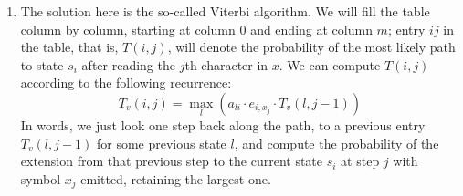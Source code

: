 \documentclass[11pt]{article}
\begin{document}
\begin{enumerate}
  \item
  The solution here is the so-called Viterbi algorithm.  We will fill the table
  column by column, starting at column 0 and ending at column $m$; entry
  $ij$ in the table, that is, $T(i,j)$, will denote the probability of
  the most likely path to state $s_i$ after reading the $j$th character in $x$.
  We can compute $T(i,j)$ according to the following recurrence:
    $$T_v(i,j) = \max_{l} \left(a_{li}\cdot e_{i,x_j}\cdot T_v(l,j-1)\right)$$
  In words, we just look one step back along the path, to a previous
  entry $T_v(l,j-1)$ for some previous state $l$, and compute the probability
  of the extension from that previous step to the current state $s_i$
  at step $j$ with symbol $x_j$ emitted, retaining the largest one.


\end{enumerate}
\end{document}
